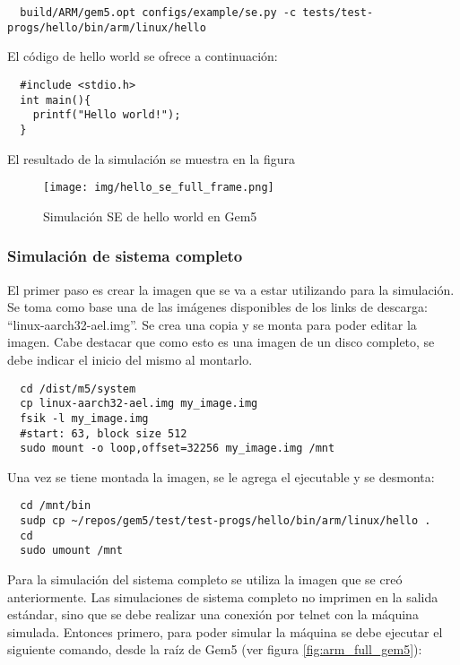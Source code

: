 \documentclass {article}
\begin{document}
\begin{lstlisting}
  build/ARM/gem5.opt configs/example/se.py -c tests/test-progs/hello/bin/arm/linux/hello
\end{lstlisting}

El código de hello world se ofrece a continuación:

\begin{lstlisting}
  #include <stdio.h>
  int main(){
    printf("Hello world!");
  }
\end{lstlisting}

El resultado de la simulación se muestra en la figura %

\begin{figure}[H]
  \centering
  \texttt{[image: img/hello\_se\_full\_frame.png]}
  \caption{\label{fig:se_arm} Simulación SE de hello world en Gem5}
\end{figure}

\subsubsection{Simulación de sistema completo}
El primer paso es crear la imagen que se va a estar utilizando para la simulación. Se toma como base
una de las imágenes disponibles de los links de descarga: ``linux-aarch32-ael.img''. Se crea una
copia y se monta para poder editar la imagen. Cabe destacar que como esto es una imagen de un disco
completo, se debe indicar el inicio del mismo al montarlo.

\begin{lstlisting}
  cd /dist/m5/system
  cp linux-aarch32-ael.img my_image.img
  fsik -l my_image.img
  #start: 63, block size 512
  sudo mount -o loop,offset=32256 my_image.img /mnt
\end{lstlisting}

Una vez se tiene montada la imagen, se le agrega el ejecutable y se desmonta:
\begin{lstlisting}
  cd /mnt/bin
  sudp cp ~/repos/gem5/test/test-progs/hello/bin/arm/linux/hello .
  cd
  sudo umount /mnt
\end{lstlisting}

Para la simulación del sistema completo se utiliza la imagen que se creó anteriormente.
Las simulaciones de sistema completo no imprimen en la salida estándar, sino que se
debe realizar una conexión por telnet con la máquina simulada. Entonces primero, para poder simular
la máquina se debe ejecutar el siguiente comando, desde la raíz de Gem5 (ver figura
\ref{fig:arm_full_gem5}):
\end{document}
